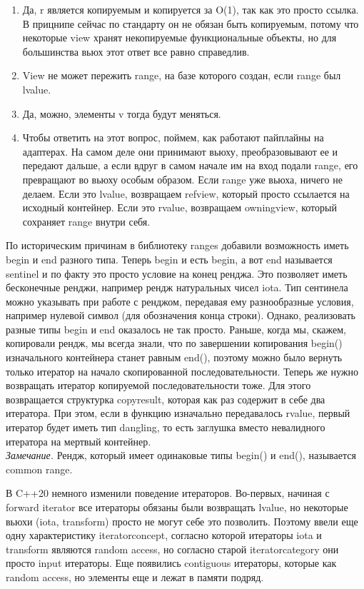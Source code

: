 \documentclass[12pt, a4paper]{article}
\begin{document}
\begin{enumerate}
	\item Да, r является копируемым и копируется за O(1), так как это просто ссылка. В прицнипе сейчас по стандарту он не обязан быть копируемым, потому что некоторые view хранят некопируемые функциональные объекты, но для большинства вьюх этот ответ все равно справедлив.
	\item View не может пережить range, на базе которого создан, если range был lvalue.
	\item Да, можно, элементы v тогда будут меняться.
	\item Чтобы ответить на этот вопрос, поймем, как работают пайплайны на адаптерах. На самом деле они принимают вьюху, преобразовывают ее и передают дальше, а если вдруг в самом начале им на вход подали range, его превращают во вьюху особым образом. Если range уже вьюха, ничего не делаем. Если это lvalue, возвращаем ref\textunderscore view, который просто ссылается на исходный контейнер. Если это rvalue, возвращаем owning\textunderscore view, который сохраняет range внутри себя.
\end{enumerate}
По историческим причинам в библиотеку ranges добавили возможность иметь begin и end разного типа. Теперь begin и есть begin, а вот end называется sentinel и по факту это просто условие на конец ренджа. Это позволяет иметь бесконечные ренджи, например рендж натуральных чисел iota. Тип сентинела можно указывать при работе с ренджом, передавая ему разнообразные условия, например нулевой символ (для обозначения конца строки). Однако, реализовать разные типы begin и end оказалось не так просто. Раньше, когда мы, скажем, копировали рендж, мы всегда знали, что по завершении копирования begin() изначального контейнера станет равным end(), поэтому можно было вернуть только итератор на начало скопированной последовательности. Теперь же нужно возвращать итератор копируемой последовательности тоже. Для этого возвращается структурка copy\textunderscore result, которая как раз содержит в себе два итератора. При этом, если в функцию изначально передавалось rvalue, первый итератор будет иметь тип dangling, то есть заглушка вместо невалидного итератора на мертвый контейнер. \\
\textit{Замечание.} Рендж, который имеет одинаковые типы begin() и end(), называется common range.
\par В C++20 немного изменили поведение итераторов. Во-первых, начиная с forward iterator все итераторы обязаны были возвращать lvalue, но некоторые вьюхи (iota, transform) просто не могут себе это позволить. Поэтому ввели еще одну характеристику iterator\textunderscore concept, согласно которой итераторы iota и transform являются random access, но согласно старой iterator\textunderscore category они просто input итераторы. Еще появились contiguous итераторы, которые как random access, но элементы еще и лежат в памяти подряд. 
\end{document}
